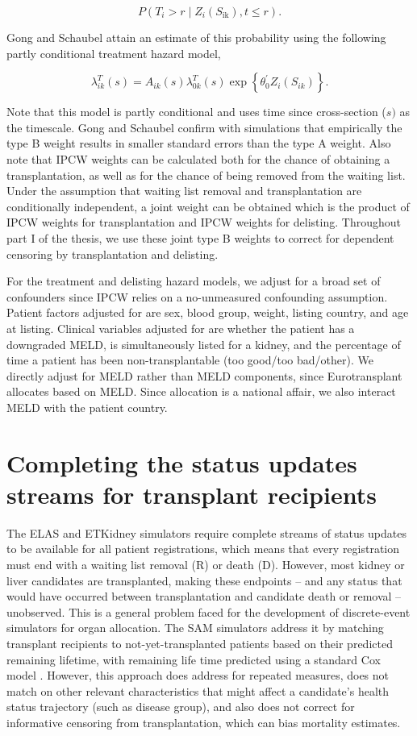 \documentclass[11pt,twoside,]{book}
\begin{document}
\[P\left( T_{i} > r \middle| Z_{i}\left( S_{\text{ik}} \right),t \leq r \right).\]

Gong and Schaubel attain an estimate of this probability using the
following partly conditional treatment hazard model,

\[\lambda_{ik}^{T}( s ) = A_{ik}( s )\lambda_{0k}^{T}( s )\exp\left\{ \theta_{0}^{'}Z_{i}( S_{ik} ) \right\}.\]

Note that this model is partly conditional and uses time since
cross-section (\(s)\) as the timescale. Gong and Schaubel confirm with
simulations that empirically the type B weight results in smaller
standard errors than the type A weight. Also note that IPCW weights can be calculated both for the chance of obtaining a transplantation, as well as for the chance of being removed from the waiting
list. Under the assumption that waiting list removal and transplantation
are conditionally independent, a joint weight can be obtained which is the
product of IPCW weights for transplantation and IPCW weights for delisting.
Throughout part I of the thesis, we use these joint type B weights to correct
for dependent censoring by transplantation and delisting.

For the treatment and delisting hazard models, we adjust for a broad set of
confounders since IPCW relies on a no-unmeasured confounding assumption.
Patient factors adjusted for are sex, blood group, weight, listing country,
and age at listing. Clinical variables adjusted for are whether the patient
has a downgraded MELD, is simultaneously listed for a kidney, and the percentage
of time a patient has been non-transplantable (too good/too bad/other).
We directly adjust for MELD rather than MELD components, since Eurotransplant
allocates based on MELD. Since allocation is a national affair, we also
interact MELD with the patient country.

\chapter{Completing the status updates streams for transplant recipients}\label{APPimputation}


The ELAS and ETKidney simulators require complete streams of status updates
to be available for all patient registrations, which means that every registration
must end with a waiting list removal (R) or death (D). However, most kidney or
liver candidates are transplanted, making these endpoints -- and any status
that would have occurred between transplantation and candidate death or removal --
unobserved. This is a general problem faced for the development of
discrete-event simulators for organ allocation. The SAM simulators address
it by matching transplant recipients to not-yet-transplanted patients based
on their predicted remaining lifetime, with remaining life time predicted using
a standard Cox model \citep{SRTR2019}. However, this
approach does address for repeated measures, does not match on other relevant
characteristics that might affect a candidate's health status trajectory (such as
disease group), and also does not correct for informative censoring from
transplantation, which can bias mortality estimates.
\end{document}
